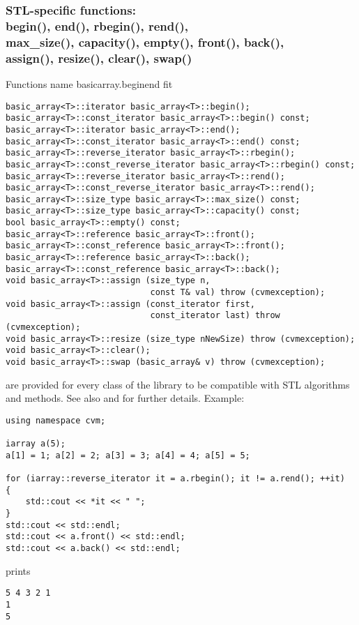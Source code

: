 \subsubsection{STL-specific functions:\\
begin(), end(), rbegin(), rend(), \\
max\_size(), capacity(), empty(), front(), back(),\\
assign(), resize(), clear(), swap()}
Functions%
\pdfdest name {basicarray.beginend} fit
\begin{verbatim}
basic_array<T>::iterator basic_array<T>::begin();
basic_array<T>::const_iterator basic_array<T>::begin() const;
basic_array<T>::iterator basic_array<T>::end();
basic_array<T>::const_iterator basic_array<T>::end() const;
basic_array<T>::reverse_iterator basic_array<T>::rbegin();
basic_array<T>::const_reverse_iterator basic_array<T>::rbegin() const;
basic_array<T>::reverse_iterator basic_array<T>::rend();
basic_array<T>::const_reverse_iterator basic_array<T>::rend();
basic_array<T>::size_type basic_array<T>::max_size() const;
basic_array<T>::size_type basic_array<T>::capacity() const;
bool basic_array<T>::empty() const;
basic_array<T>::reference basic_array<T>::front();
basic_array<T>::const_reference basic_array<T>::front();
basic_array<T>::reference basic_array<T>::back();
basic_array<T>::const_reference basic_array<T>::back();
void basic_array<T>::assign (size_type n, 
                             const T& val) throw (cvmexception);
void basic_array<T>::assign (const_iterator first, 
                             const_iterator last) throw (cvmexception);
void basic_array<T>::resize (size_type nNewSize) throw (cvmexception);
void basic_array<T>::clear();
void basic_array<T>::swap (basic_array& v) throw (cvmexception);
\end{verbatim}
are provided for every class of the library to be compatible 
with STL algorithms and methods. See also 
and 
for further details.
Example:
\begin{Verbatim}
using namespace cvm;

iarray a(5);
a[1] = 1; a[2] = 2; a[3] = 3; a[4] = 4; a[5] = 5;

for (iarray::reverse_iterator it = a.rbegin(); it != a.rend(); ++it)
{
    std::cout << *it << " ";
}
std::cout << std::endl;
std::cout << a.front() << std::endl;
std::cout << a.back() << std::endl;
\end{Verbatim}
prints
\begin{Verbatim}
5 4 3 2 1
1
5
\end{Verbatim}
\newpage


